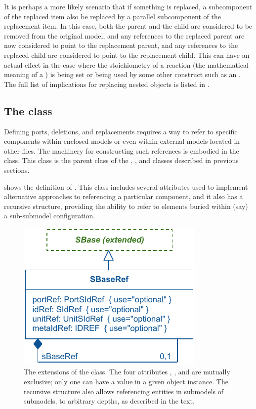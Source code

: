 It is perhaps a more likely scenario that if something is replaced, a subcomponent of the replaced item also be replaced by a parallel subcomponent of the replacement item.  In this case, both the parent and the child are considered to be removed from the original model, and any references to the replaced parent are now considered to point to the replacement parent, and any references to the replaced child are considered to point to the replacement child.  This can have an actual effect in the case where the stoichiometry of a reaction (the mathematical meaning of a \SpeciesReference) is being set or being used by some other construct such as an \InitialAssignment.  The full list of implications for replacing nested objects is listed in .



\subsection{The  class}
\label{sbaseref-class}

Defining ports, deletions, and replacements requires a way to refer to specific components within enclosed models or even within external models located in other files.  The machinery for constructing such references is embodied in the \SBaseRef class.  This class is the parent class of the \Port, \Deletion, \ReplacedElement and \ReplacedBy classes described in previous sections.

 shows the definition of \SBaseRef.  This class includes several attributes used to implement alternative approaches to referencing a particular component, and it also has a recursive structure, providing the ability to refer to elements buried within (say) a sub-submodel configuration.

\begin{figure}[hbt]
  \includegraphics{figs/sbaseref-uml}
  \caption{The extensions of the \SBaseRef class.  The four attributes
    , ,  and 
    are mutually exclusive; only one can have a value in a given object
    instance.  The recursive structure also allows referencing entities
    in submodels of submodels, to arbitrary depths, as described in the
    text.}
  \label{sbaseref-uml}
\end{figure}


